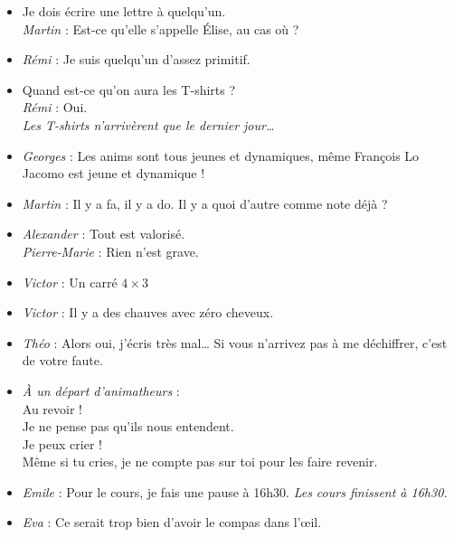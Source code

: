 \begin{itemize}
\item \og Je dois écrire une lettre à quelqu'un. \fg \\
\textit{Martin} : \og Est-ce qu'elle s'appelle Élise, au cas où ? \fg

\item \textit{Rémi} : \og Je suis quelqu'un d'assez primitif. \fg

 \item \og Quand est-ce qu'on aura les T-shirts ? \fg \\
\textit{Rémi} : \og Oui. \fg \\
\textit{Les T-shirts n'arrivèrent que le dernier jour…}

\item \textit{Georges} : \og Les anims sont tous jeunes et dynamiques, même François Lo Jacomo est jeune et dynamique ! \fg

\item \textit{Martin} : \og Il y a fa, il y a do. Il y a quoi d'autre comme note déjà ? \fg

\item \textit{Alexander} : \og Tout est valorisé. \fg \\
\textit{Pierre-Marie} : \og Rien n'est grave. \fg

\item \textit{Victor} : \og Un carré $4\times 3$ \fg

\item \textit{Victor} : \og Il y a des chauves avec zéro cheveux. \fg

\item \textit{Théo} : \og Alors oui, j'écris très mal… Si vous n'arrivez pas à me déchiffrer, c'est de votre faute. \fg

\item \textit{À un départ d'animatheurs} : \\
\og Au revoir ! \fg \\
\og Je ne pense pas qu'ils nous entendent. \fg \\
\og Je peux crier ! \fg \\
\og Même si tu cries, je ne compte pas sur toi pour les faire revenir. \fg

\item \textit{Emile} : \og Pour le cours, je fais une pause à 16h30. \fg
\textit{Les cours finissent à 16h30.}

\item \textit{Eva} : \og Ce serait trop bien d'avoir le compas dans l'œil. \fg


\end{itemize}

